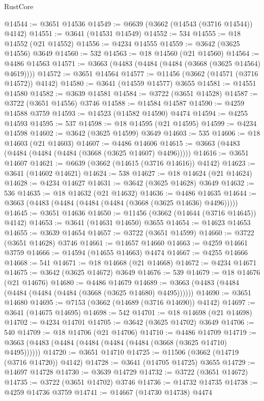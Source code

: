 \begin{lexlean}{RustCore}
\begin{coremodule}
@14544 := @3651 @14536
@14549 := @6639 (@3662 (@14543 (@3716 @14544)) @4142)
@14551 := @3641 (@14531 @14549)
@14552 := 534
@14555 := @18 @14552 (@21 @14552)
@14556 := @4234 @14555
@14559 := @3642 (@3625 @14556) @3649
@14560 := 532
@14563 := @18 @14560 (@21 @14560)
@14564 := @4486 @14563
@14571 := @3663 (@4483 (@4484 (@4484 (@3668 (@3625 @14564) @4619))))
@14572 := @3651 @14564
@14577 := @11456 (@3662 (@14571 (@3716 @14572)) @4142)
@14580 := @3641 (@14559 @14577) @3655
@14581 := @14551 @14580
@14582 := @3639 @14581
@14584 := @3722 (@3651 @14528)
@14587 := @3722 (@3651 @14556) @3746
@14588 := @14584 @14587
@14590 := @4259 @14588 @3759
@14593 := @14523 (@14582 @14590) @4474
@14594 := @4255 @14593
@14595 := 537
@14598 := @18 @14595 (@21 @14595)
@14599 := @4234 @14598
@14602 := @3642 (@3625 @14599) @3649
@14603 := 535
@14606 := @18 @14603 (@21 @14603)
@14607 := @4486 @14606
@14615 := @3663 (@4483 (@4484 (@4484 (@4484 (@3668 (@3625 @14607) @4496)))))
@14616 := @3651 @14607
@14621 := @6639 (@3662 (@14615 (@3716 @14616)) @4142)
@14623 := @3641 (@14602 @14621)
@14624 := 538
@14627 := @18 @14624 (@21 @14624)
@14628 := @4234 @14627
@14631 := @3642 (@3625 @14628) @3649
@14632 := 536
@14635 := @18 @14632 (@21 @14632)
@14636 := @4486 @14635
@14644 := @3663 (@4483 (@4484 (@4484 (@4484 (@3668 (@3625 @14636) @4496)))))
@14645 := @3651 @14636
@14650 := @11456 (@3662 (@14644 (@3716 @14645)) @4142)
@14653 := @3641 (@14631 @14650) @3655
@14654 := @14623 @14653
@14655 := @3639 @14654
@14657 := @3722 (@3651 @14599)
@14660 := @3722 (@3651 @14628) @3746
@14661 := @14657 @14660
@14663 := @4259 @14661 @3759
@14666 := @14594 (@14655 @14663) @4474
@14667 := @4255 @14666
@14668 := 541
@14671 := @18 @14668 (@21 @14668)
@14672 := @4234 @14671
@14675 := @3642 (@3625 @14672) @3649
@14676 := 539
@14679 := @18 @14676 (@21 @14676)
@14680 := @4486 @14679
@14689 := @3663 (@4483 (@4484 (@4484 (@4484 (@4484 (@3668 (@3625 @14680) @4495))))))
@14690 := @3651 @14680
@14695 := @7153 (@3662 (@14689 (@3716 @14690)) @4142)
@14697 := @3641 (@14675 @14695)
@14698 := 542
@14701 := @18 @14698 (@21 @14698)
@14702 := @4234 @14701
@14705 := @3642 (@3625 @14702) @3649
@14706 := 540
@14709 := @18 @14706 (@21 @14706)
@14710 := @4486 @14709
@14719 := @3663 (@4483 (@4484 (@4484 (@4484 (@4484 (@3668 (@3625 @14710) @4495))))))
@14720 := @3651 @14710
@14725 := @11506 (@3662 (@14719 (@3716 @14720)) @4142)
@14728 := @3641 (@14705 @14725) @3655
@14729 := @14697 @14728
@14730 := @3639 @14729
@14732 := @3722 (@3651 @14672)
@14735 := @3722 (@3651 @14702) @3746
@14736 := @14732 @14735
@14738 := @4259 @14736 @3759
@14741 := @14667 (@14730 @14738) @4474

\end{coremodule}
\end{lexlean}

